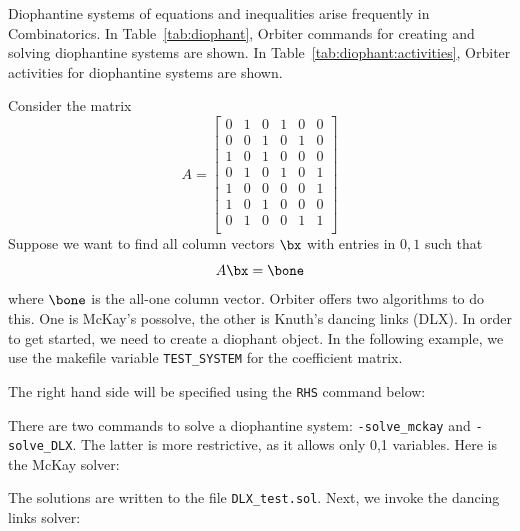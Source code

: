 Diophantine systems of equations and inequalities arise frequently in Combinatorics.
In Table~\ref{tab:diophant}, Orbiter commands for creating and solving diophantine systems are shown.
In Table~\ref{tab:diophant:activities}, Orbiter activities for diophantine systems are shown.


Consider the matrix 
$$
A= 
\left[
\begin{array}{cccccc}
0&1&0&1&0&0\\
0&0&1&0&1&0\\
1&0&1&0&0&0\\
0&1&0&1&0&1\\
1&0&0&0&0&1\\
1&0&1&0&0&0\\
0&1&0&0&1&1\\
\end{array}
\right]
$$
Suppose we want to find all column vectors $\bx$ with entries in $0,1$ such that 
$$
A \bx = \bone
$$
where $\bone$ is the all-one column vector.
Orbiter offers two algorithms to do this. 
One is McKay's possolve, the other is Knuth's dancing links (DLX).
In order to get started, we need to create a diophant object.
In the following example, we use the makefile variable \verb'TEST_SYSTEM' for the 
coefficient matrix. 


The right hand side will be specified using the \verb'RHS' command below:



There are two commands to solve a diophantine system: \verb'-solve_mckay' and \verb'-solve_DLX'. The latter is more restrictive, 
as it allows only 0,1 variables.
Here is the McKay solver:


The solutions are written to the file \verb'DLX_test.sol'. 
Next, we invoke the dancing links solver:




\bigskip

